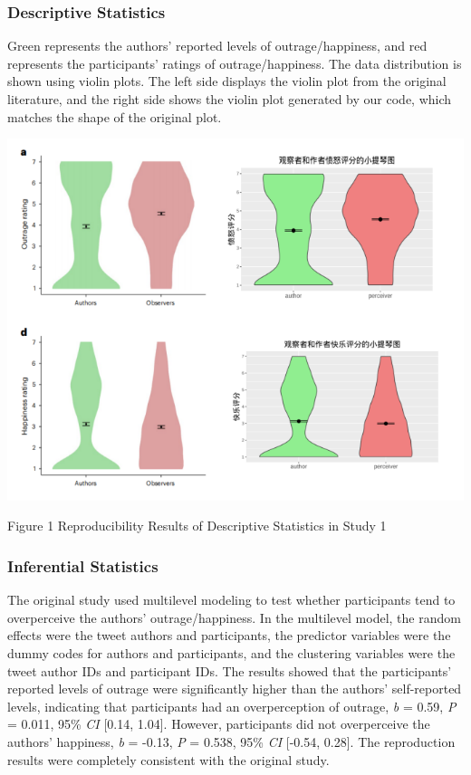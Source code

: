 \documentclass[
  man]{apa6}
\begin{document}
\hypertarget{descriptive-statistics}{%
\subsubsection{Descriptive Statistics}\label{descriptive-statistics}}

Green represents the authors' reported levels of outrage/happiness, and red represents the participants' ratings of outrage/happiness. The data distribution is shown using violin plots. The left side displays the violin plot from the original literature, and the right side shows the violin plot generated by our code, which matches the shape of the original plot.

\begin{center}
\includegraphics{study1_Violin_Plot.png}
\end{center}
\begin{center}
Figure 1 Reproducibility Results of Descriptive Statistics in Study 1
\end{center}

\hypertarget{inferential-statistics}{%
\subsubsection{Inferential Statistics}\label{inferential-statistics}}

The original study used multilevel modeling to test whether participants tend to overperceive the authors' outrage/happiness. In the multilevel model, the random effects were the tweet authors and participants, the predictor variables were the dummy codes for authors and participants, and the clustering variables were the tweet author IDs and participant IDs. The results showed that the participants' reported levels of outrage were significantly higher than the authors' self-reported levels, indicating that participants had an overperception of outrage, \emph{b} = 0.59, \emph{P} = 0.011, 95\% \emph{CI} {[}0.14, 1.04{]}. However, participants did not overperceive the authors' happiness, \emph{b} = -0.13, \emph{P} = 0.538, 95\% \emph{CI} {[}-0.54, 0.28{]}. The reproduction results were completely consistent with the original study.
\end{document}
